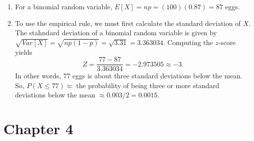 \documentclass{article}\usepackage[]{graphicx}\usepackage[]{color}
\begin{document}
\begin{enumerate}
\begin{enumerate}
    \item For a binomial random variable, $E\left[X\right] = np = (100)(0.87) = 87$ eggs.
    
    \item To use the empirical rule, we must first calculate the standard deviation of $X$. The stahndard deviation of a binomial random variable is given by $\sqrt{Var\left[X\right]} = \sqrt{np(1-p)} = \sqrt{3.31} = 3.363034$. Computing the $z$-score yields
    \begin{equation*}
      Z = \frac{77 - 87}{3.363034} = -2.973505 \approx -3.
    \end{equation*}
  In other words, 77 eggs is about three standard deviations below the mean. So, $P\left(X \le 77\right) \approx$ the probability of being three or more standard deviations below the mean $\approx 0.003 / 2 = 0.0015$.

  \end{enumerate}
  
\end{enumerate}




\section{Chapter 4}
\end{document}
